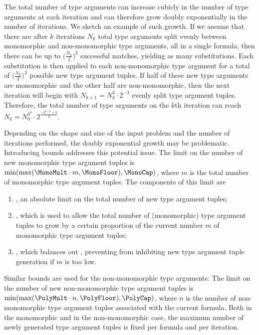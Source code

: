\documentclass[]{ceurart}
\begin{document}
The total number of type arguments can increase cubicly in the number of type arguments at each iteration and can therefore grow doubly exponentially in the number of iterations. We sketch an example of such growth. If we assume that there are after \(k\) iterations \(N_k\) total type arguments split evenly between monomorphic and non-monomorphic type arguments, all in a single formula, then there can be up to \(\bigl(\frac{N_k}{2}\bigr)^2\) successful matches, yielding as many substitutions. Each substitution is then applied to each non-monomorphic type argument for a total of \(\bigl(\frac{N_k}{2}\bigr)^3\) possible new type argument tuples. If half of these new type arguments are monomorphic and the other half are non-monomorphic, then the next iteration will begin with \(N_{k+1} = N_k^3 \cdot 2^{-3}\) evenly split type argument tuples. Therefore, the total number of type arguments on the \(k\)th iteration can reach \(N_k = N_0^{3^k} \cdot 2^{\frac{-3^{k+2}+3}{2}}\).

   Depending on the shape and size of the input problem and the number of iterations performed, the doubly exponential growth may be problematic. Introducing bounds addresses this potential issue. The limit on the number of new monomorphic type argument tuples is \(\min(\max(\MonoMult\cdot m, \MonoFloor), \MonoCap)\), where \(m\) is the total number of monomorphic type argument tuples. The components of this limit are
\begin{enumerate}
   \item \MonoCap, an absolute limit on the total number of new type argument tuples;
   \item \MonoMult, which is used to allow the total number of (monomorphic) type argument tuples to grow by a certain proportion of the current number \(m\) of monomorphic type argument tuples;
   \item \MonoFloor, which balances out \MonoMult, preventing \MonoMult from inhibiting new type argument tuple generation if \(m\) is too low.
\end{enumerate}

Similar bounds are used for the non-monomorphic type arguments:
The limit on the number of new non-monomorphic type argument tuples is \(\min(\max(\PolyMult\cdot n, \PolyFloor),\allowbreak \PolyCap)\), where \(n\) is the number of non-monomorphic type argument tuples associated with the current formula.
Both in the monomorphic and in the non-monomorphic case, the maximum number of newly generated type argument tuples is fixed per formula and per iteration.
\end{document}
